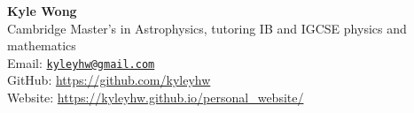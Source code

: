 \documentclass[a4paper,10pt]{extarticle}
\newlength{\cvEntryGap}   \setlength{\cvEntryGap}{8pt}   %
\begin{document}
\pagestyle{fancy}
\renewcommand{\headrulewidth}{0pt}
\fancyhead{}
\fancyhead[R]{\textit{\monthyeardate\today}}
\thispagestyle{empty} %

\begin{flushleft}
\textbf{\LARGE Kyle Wong}\\[\cvEntryGap] %
Cambridge Master's in Astrophysics, tutoring IB and IGCSE physics and mathematics
\\ Email: \href{mailto:kyleyhw@gmail.com}{\nolinkurl{kyleyhw@gmail.com}} %
\\ GitHub: \url{https://github.com/kyleyhw}
\\ Website: \url{https://kyleyhw.github.io/personal_website/}


\end{flushleft}











\end{document}
